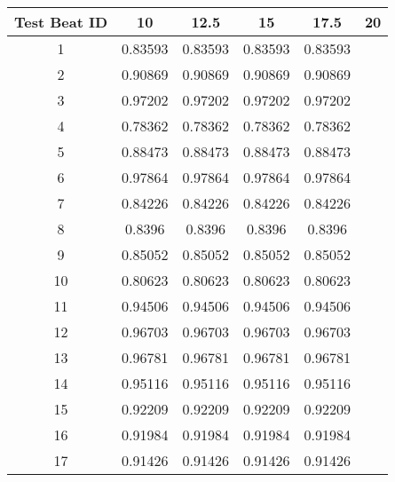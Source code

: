 \begin{tabular}{|c|c|c|c|c|c|}
\hline 
Test Beat ID & 10 & 12.5 & 15 & 17.5 & 20 \\ 
\hline 
1 & 0.83593 & 0.83593 & 0.83593 & 0.83593 &  \\ 
2 & 0.90869 & 0.90869 & 0.90869 & 0.90869 &  \\ 
3 & 0.97202 & 0.97202 & 0.97202 & 0.97202 &  \\ 
4 & 0.78362 & 0.78362 & 0.78362 & 0.78362 &  \\ 
5 & 0.88473 & 0.88473 & 0.88473 & 0.88473 &  \\ 
6 & 0.97864 & 0.97864 & 0.97864 & 0.97864 &  \\ 
7 & 0.84226 & 0.84226 & 0.84226 & 0.84226 &  \\ 
8 & 0.8396 & 0.8396 & 0.8396 & 0.8396 &  \\ 
9 & 0.85052 & 0.85052 & 0.85052 & 0.85052 &  \\ 
10 & 0.80623 & 0.80623 & 0.80623 & 0.80623 &  \\ 
11 & 0.94506 & 0.94506 & 0.94506 & 0.94506 &  \\ 
12 & 0.96703 & 0.96703 & 0.96703 & 0.96703 &  \\ 
13 & 0.96781 & 0.96781 & 0.96781 & 0.96781 &  \\ 
14 & 0.95116 & 0.95116 & 0.95116 & 0.95116 &  \\ 
15 & 0.92209 & 0.92209 & 0.92209 & 0.92209 &  \\ 
16 & 0.91984 & 0.91984 & 0.91984 & 0.91984 &  \\ 
17 & 0.91426 & 0.91426 & 0.91426 & 0.91426 &  \\ 
\hline 
\end{tabular}